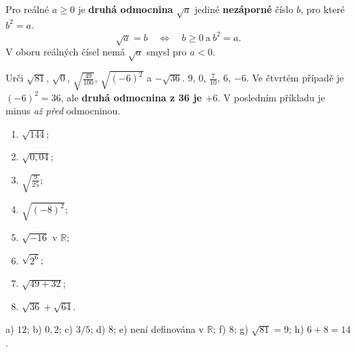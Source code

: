\documentclass[11pt,a4paper]{article}
\begin{document}
\begin{definiceBox}[title={Definice - Druhá odmocnina}]
Pro reálné $a\ge0$ je \textbf{druhá odmocnina} $\sqrt a$ jediné
\textbf{nezáporné} číslo $b$, pro které $b^2=a$.
\[
\boxed{\sqrt a=b\quad\Longleftrightarrow\quad b\ge0\ \text{a}\ b^2=a.}
\]
V oboru reálných čísel nemá $\sqrt a$ smysl pro $a<0$.
\end{definiceBox}
\begin{prikladReseniBox}[title={Příklad 1}]
Urči $\sqrt{81}$, $\sqrt{0}$, $\sqrt{\frac{49}{100}}$,
$\sqrt{(-6)^2}$ a $-\sqrt{36}$.
\tcblower
$9$, $0$, $\frac7{10}$, $6$, $-6$.
Ve čtvrtém případě je $(-6)^2=36$, ale \textbf{druhá odmocnina z 36 je $+6$}.
V posledním příkladu je minus \emph{až před} odmocninou.
\end{prikladReseniBox}
\begin{zadaniReseniBox}[title={Samostatná práce 1}]
\begin{enumerate}[label=\alph*)]
\item $\sqrt{144}$; \item $\sqrt{0{,}04}$;
\item $\sqrt{\frac9{25}}$; \item $\sqrt{(-8)^2}$;
\item $\sqrt{-16}$ v $\mathbb R$; \item $\sqrt{2^6}$;
\item $\sqrt{49+32}$; \item $\sqrt{36}+\sqrt{64}$.
\end{enumerate}
\tcblower
 a) $12$; b) $0{,}2$; c) $3/5$; d) $8$;
 e) není definována v $\mathbb R$; f) $8$;
 g) $\sqrt{81}=9$; h) $6+8=14$.
\end{zadaniReseniBox}
\end{document}
